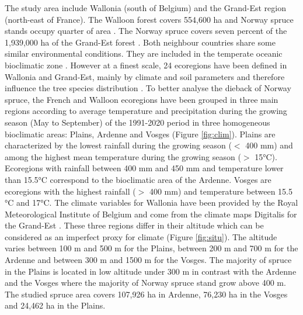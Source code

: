 \documentclass[3p,procedia]{elsarticle}
\def\surfEPVosges{76,230 }
\begin{document}
The study area include Wallonia (south of Belgium) and the Grand-Est region (north-east of France).
The Walloon forest covers 554,600 ha and  Norway spruce stands occupy quarter of area \citep{lejeune_ep_2022}.  
The Norway spruce covers seven percent of the 1,939,000 ha of the Grand-Est forest \citep{IGN2022}. 
Both neighbour countries share some similar environmental conditions.
They are included in the temperate oceanic bioclimatic zone \citep{lindner_climate_2010}.
However at a finest scale, 24 ecoregions have been defined in  Wallonia and Grand-Est, mainly by climate and soil parameters and therefore influence the tree species distribution \citep{walthert_tree_2017}.
To better analyse the dieback of Norway spruce, the French and Walloon ecoregions have been grouped in three main regions according to average temperature and precipitation during the growing season (May to September) of the 1991-2020 period in three homogeneous bioclimatic areas: Plains, Ardenne and Vosges (Figure \ref{fig:clim}).
Plains are characterized by the lowest rainfall during the growing season ($<$ 400 mm) and among the highest mean temperature during the growing season ($>$ 15°C).
Ecoregions with rainfall between 400 mm and 450 mm and temperature lower than 15.5°C correspond to the bioclimatic area of the Ardenne.
Vosges are ecoregions with the highest rainfall ($>$ 400 mm) and temperature between 15.5 °C and 17°C.
The climate variables for Wallonia have been provided by the Royal Meteorological Institute of Belgium and come from the climate maps Digitalis for the Grand-Est \citep{piedallu_presentation_2014}.
These three regions differ in their altitude which can be considered as an imperfect proxy for climate (Figure \ref{fig:situ}). 
The altitude varies between 100 m and 500 m for the Plains, between 200 m and 700 m for the Ardenne and between 300 m and 1500 m for the Vosges.
The majority of spruce in the Plains is located in low altitude under 300 m in contrast with the Ardenne and the Vosges where the majority of Norway spruce stand grow above 400 m. 
The studied spruce area covers 107,926 ha in Ardenne, \surfEPVosges ha in the Vosges and  24,462 ha in the Plains.
\end{document}
